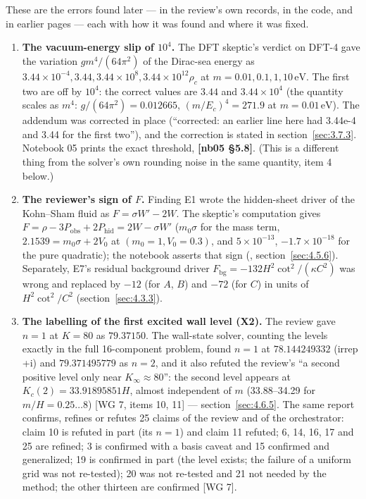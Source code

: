 These are the errors found later --- in the review's own records, in the code, and in earlier pages --- each with how it was found and where it was fixed.

\begin{enumerate}
  \item \textbf{The vacuum-energy slip of $10^{4}$.} The DFT skeptic's verdict on DFT-4 gave the variation $g m^{4}/(64 \pi^{2})$ of the Dirac-sea energy as $3.44\times10^{-4}, 3.44, 3.44\times10^{8}, 3.44\times10^{12} \rho_c$ at $m = 0.01, 0.1, 1, 10\,\mathrm{eV}$. The first two are off by $10^{4}$: the correct values are $3.44$ and $3.44\times10^{4}$ (the quantity scales as $m^{4}$: $g/(64 \pi^{2}) = 0.012665$, $(m/E_c)^{4} = 271.9$ at $m = 0.01\,\mathrm{eV}$). The addendum was corrected in place (``corrected: an earlier line here had 3.44e-4 and 3.44 for the first two''), and the correction is stated in section~\ref{sec:3.7.3}. Notebook 05 prints the exact threshold,  \textbf{[nb05 \S{}5.8]}. (This is a different thing from the solver's own rounding noise in the same quantity, item 4 below.)
  \item \textbf{The reviewer's sign of $F$.} Finding E1 wrote the hidden-sheet driver of the Kohn--Sham fluid as $F = \sigma W' - 2W$. The skeptic's computation gives $F = \rho - 3 P_{\mathrm{obs}} + 2 P_{\mathrm{hid}} = 2W - \sigma W'$ ($m_0 \sigma$ for the mass term, $2.1539 = m_0 \sigma + 2V_0$ at $(m_0 = 1, V_0 = 0.3)$, and $5\times10^{-13}$, $-1.7\times10^{-18}$ for the pure quadratic); the notebook asserts that sign (, section~\ref{sec:4.5.6}). Separately, E7's residual background driver $F_{\mathrm{bg}}=-132H^2\cot^2/(\kappa C^2)$ was wrong and replaced by $-12$ (for $A$, $B$) and $-72$ (for $C$) in units of $H^2\cot^2/C^2$ (section~\ref{sec:4.3.3}).
  \item \textbf{The labelling of the first excited wall level (X2).} The review gave $n = 1$ at $K = 80$ as $79.37150$. The wall-state solver, counting the levels exactly in the full 16-component problem, found $n = 1$ at $78.144249332$ (irrep +i) and $79.371495779$ as $n = 2$, and it also refuted the review's ``a second positive level only near $K_\infty \approx 80$'': the second level appears at $K_{c}(2) = 33.91895851 H$, almost independent of $m$ (33.88--34.29 for $m/H = 0.25\ldots 8$) [WG 7, items 10, 11] --- section~\ref{sec:4.6.5}. The same report confirms, refines or refutes 25 claims of the review and of the orchestrator: claim 10 is refuted in part (its $n = 1$) and claim 11 refuted; 6, 14, 16, 17 and 25 are refined; 3 is confirmed with a basis caveat and 15 confirmed and generalized; 19 is confirmed in part (the level exists; the failure of a uniform grid was not re-tested); 20 was not re-tested and 21 not needed by the method; the other thirteen are confirmed [WG 7].

\end{enumerate}

